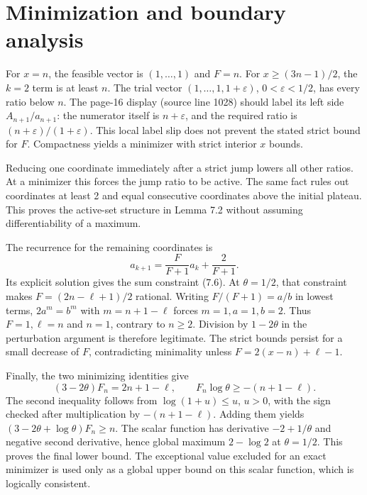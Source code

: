 \documentclass[10pt]{article}
\begin{document}
\section*{Minimization and boundary analysis}
For \(x=n\), the feasible vector is \((1,\ldots,1)\) and \(F=n\). For \(x\ge(3n-1)/2\), the \(k=2\) term is at least \(n\). The trial vector \((1,\ldots,1,1+\varepsilon)\), \(0<\varepsilon<1/2\), has every ratio below \(n\). The page-16 display (source line 1028) should label its left side \(A_{n+1}/a_{n+1}\): the numerator itself is \(n+\varepsilon\), and the required ratio is \((n+\varepsilon)/(1+\varepsilon)\). This local label slip does not prevent the stated strict bound for \(F\). Compactness yields a minimizer with strict interior \(x\) bounds.\par
Reducing one coordinate immediately after a strict jump lowers all other ratios. At a minimizer this forces the jump ratio to be active. The same fact rules out coordinates at least 2 and equal consecutive coordinates above the initial plateau. This proves the active-set structure in Lemma 7.2 without assuming differentiability of a maximum.\par
The recurrence for the remaining coordinates is \[a_{k+1}=\frac{F}{F+1}a_k+\frac2{F+1}.\] Its explicit solution gives the sum constraint (7.6). At \(\theta=1/2\), that constraint makes \(F=(2n-\ell+1)/2\) rational. Writing \(F/(F+1)=a/b\) in lowest terms, \(2a^m=b^m\) with \(m=n+1-\ell\) forces \(m=1,a=1,b=2\). Thus \(F=1,\ell=n\) and \(n=1\), contrary to \(n\ge2\). Division by \(1-2\theta\) in the perturbation argument is therefore legitimate. The strict bounds persist for a small decrease of \(F\), contradicting minimality unless \(F=2(x-n)+\ell-1\).\par
Finally, the two minimizing identities give \[(3-2\theta)F_n=2n+1-\ell,\qquad
 F_n\log\theta\ge-(n+1-\ell).\] The second inequality follows from \(\log(1+u)\le u\), \(u>0\), with the sign checked after multiplication by \(-(n+1-\ell)\). Adding them yields \((3-2\theta+\log\theta)F_n\ge n\). The scalar function has derivative \(-2+1/\theta\) and negative second derivative, hence global maximum \(2-\log2\) at \(\theta=1/2\). This proves the final lower bound. The exceptional value excluded for an exact minimizer is used only as a global upper bound on this scalar function, which is logically consistent.\par
\end{document}
